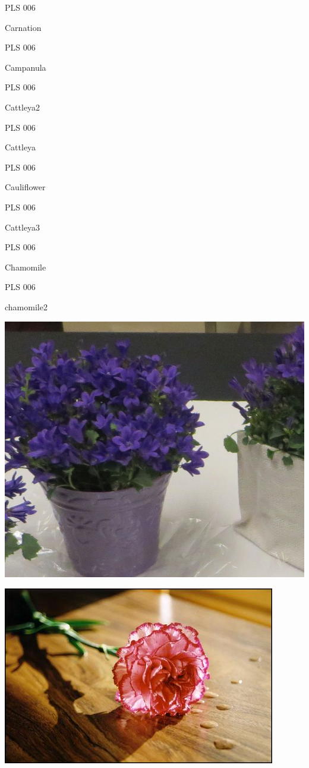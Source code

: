 \documentclass{article}
\begin{document}
\noindent  PLS 006
\vfill
\centerline{{\huge Carnation }}
\vfill
\newpage

\noindent  PLS 006
\vfill
\centerline{{\huge Campanula }}
\vfill
\newpage

\noindent  PLS 006
\vfill
\centerline{{\huge Cattleya2 }}
\vfill
\newpage

\noindent  PLS 006
\vfill
\centerline{{\huge Cattleya }}
\vfill
\newpage

\noindent  PLS 006
\vfill
\centerline{{\huge Cauliflower }}
\vfill
\newpage

\noindent  PLS 006
\vfill
\centerline{{\huge Cattleya3 }}
\vfill
\newpage

\noindent  PLS 006
\vfill
\centerline{{\huge Chamomile }}
\vfill
\newpage

\noindent  PLS 006
\vfill
\centerline{{\huge chamomile2 }}
\vfill
\newpage

\begin{center}
\includegraphics[height=0.925\paperheight]{../Campanula.jpg}
\end{center}
\newpage

\begin{center}
\includegraphics[height=0.925\paperheight]{../Carnation.jpg}
\end{center}
\newpage
\end{document}
